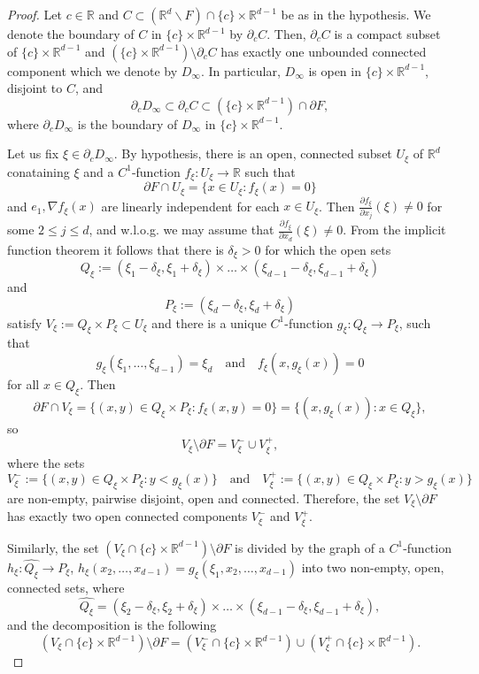 \documentclass[10pt,a4paper]{amsart}
\newcommand{\R}{\mathbb R}
\begin{document}
\begin{proof}
Let $c\in\R$ and $C\subset \left(\R^d\backslash F\right)\cap \{c\}\times\R^{d-1}$ be as in the hypothesis. We denote the boundary of $C$ in $\{c\}\times\R^{d-1}$ by $\partial_c C$. Then, $\partial_c C$ is a compact subset of $\{c\}\times\R^{d-1}$ and $\left(\{c\}\times\R^{d-1}\right)\setminus \partial_c C$ has exactly one unbounded connected component which we denote by $D_\infty$. In particular, $D_\infty$ is open in $\{c\}\times\R^{d-1}$, disjoint to $C$, and 
\begin{equation}\label{eq:set inclusion 1}
	\partial_cD_\infty\subset\partial_cC\subset\left(\{c\}\times\R^{d-1}\right)\cap \partial F,
\end{equation}
where $\partial_c D_\infty$ is the boundary of $D_\infty$ in $\{c\}\times\R^{d-1}$. 

Let us fix $\xi\in\partial_c D_\infty$. By hypothesis, there is an open, connected subset $U_\xi$ of $\R^d$ conataining $\xi$ and a $C^1$-function $f_\xi:U_\xi\rightarrow \R$ such that
	$$\partial F\cap U_\xi=\{x\in U_\xi \colon f_\xi(x)=0\}$$
	and $e_1, \nabla f_\xi(x)$ are linearly independent for each $x\in U_\xi$. 
Then
$\frac{\partial f_\xi}{\partial x_j}(\xi)\neq0$ for some $2\leq j\leq d$, and w.l.o.g. we may assume that $\frac{\partial f_\xi}{\partial x_d}(\xi)\neq0$. 
From the implicit function theorem it follows that there is $\delta_\xi>0$ for which the open sets
$$Q_\xi:=(\xi_1-\delta_\xi,\xi_1+\delta_\xi)\times\ldots\times(\xi_{d-1}-\delta_\xi,\xi_{d-1}+\delta_\xi)$$
and
$$P_\xi:=(\xi_d-\delta_\xi,\xi_d+\delta_\xi)$$
satisfy $V_\xi:=Q_\xi\times P_\xi\subset U_\xi$ and there is a unique
$C^1$-function $g_\xi\colon Q_\xi\to P_\xi$,
such that
$$g_\xi(\xi_1,\ldots,\xi_{d-1})=\xi_d\quad\text{and}\quad f_\xi(x,g_\xi(x))=0$$
for all $x\in Q_\xi$.
Then 
$$\partial F\cap V_\xi=\{(x,y)\in Q_\xi\times P_\xi\colon f_\xi(x,y)=0\}=\{(x,g_\xi(x))\colon x\in Q_\xi\},$$ 
so
$$V_\xi\setminus\partial F=V_\xi^-\cup V_\xi^+,$$
where the sets
$$V_\xi^-:=\{(x,y)\in Q_\xi\times P_\xi\colon y<g_\xi(x)\}\quad\text{and}\quad
V_\xi^+:=\{(x,y)\in Q_\xi\times P_\xi\colon y>g_\xi(x)\}$$
are non-empty, pairwise disjoint, open and connected. Therefore, the set $V_\xi\setminus\partial F$ has exactly two open connected components $V_\xi^-$ and $V_\xi^+$.

Similarly, the set $(V_\xi\cap\{c\}\times\R^{d-1})\setminus\partial F$ is divided by the graph of a $C^1$-function $h_\xi\colon \widehat{Q_\xi}\to P_\xi$, $h_\xi(x_2,\ldots,x_{d-1})=g_\xi(\xi_1,x_2,\ldots,x_{d-1})$ into two non-empty, open, connected sets, where
$$\widehat{Q_\xi}=(\xi_2-\delta_\xi,\xi_2+\delta_\xi)\times\ldots\times(\xi_{d-1}-\delta_\xi,\xi_{d-1}+\delta_\xi),$$
and the decomposition is the following
$$(V_\xi\cap\{c\}\times\R^{d-1})\setminus\partial F=
(V_\xi^-\cap\{c\}\times\R^{d-1})\cup (V_\xi^+\cap\{c\}\times\R^{d-1}).$$


\end{proof}
\end{document}
